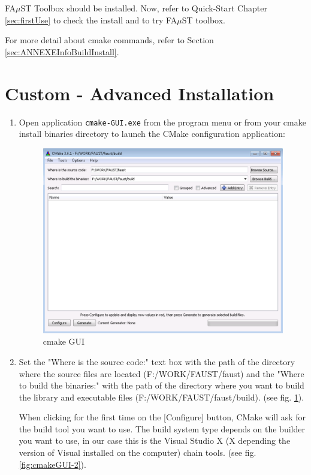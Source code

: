 FA$\mu$ST Toolbox should be installed. Now, refer to Quick-Start Chapter \ref{sec:firstUse} to check the install and to try FA$\mu$ST toolbox.

For more detail about cmake commands, refer to Section \ref{sec:ANNEXEInfoBuildInstall}.



\section{Custom - Advanced Installation}\label{sec:WinCustomInstall}
\begin{enumerate}
\item Open application \texttt{cmake-GUI.exe} from the program menu or from your cmake install binaries directory  to launch the CMake configuration application:

\begin{figure}[!h] %
\centering
\includegraphics[scale=0.5]{images/cmakeGUI-1-eps-converted-to.pdf}
\caption{cmake GUI}
\label{fig:cmakeGUI-1}
\end{figure}

\item Set the "Where is the source code:" text box with the path of the directory where the source files are located (F:/WORK/FAUST/faust) and the "Where to build the binaries:" with the path of the directory where you want to build the library and executable files (F:/WORK/FAUST/faust/build). (see fig.  \ref{fig:cmakeGUI-1}).

When clicking for the first time on the [Configure] button, CMake will ask for the build tool you want to use. The build system type depends on the builder you want to use, in our case this is the Visual Studio X (X depending the version of Visual installed on the computer) chain tools. (see fig. \ref{fig:cmakeGUI-2}).



\end{enumerate}
